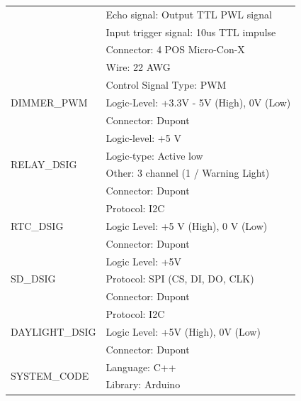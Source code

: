\documentclass{article}
\begin{document}
\begin{longtable}{|l|l|}
                                 & Echo signal: Output TTL PWL signal        \\*
                                 & Input trigger signal: 10us TTL impulse    \\*
                                 & Connector: 4 POS Micro-Con-X              \\*
                                 & Wire: 22 AWG                              \\* 
\hline
\multirow{3}{*}{DIMMER\_PWM}     & Control Signal Type: PWM                  \\*
                                 & Logic-Level: +3.3V - 5V (High), 0V (Low)  \\*
                                 & Connector: Dupont                         \\* 
\hline
\multirow{4}{*}{RELAY\_DSIG}     & Logic-level: +5 V                         \\*
                                 & Logic-type: Active low                    \\*
                                 & Other: 3 channel (1 / Warning Light)      \\*
                                 & Connector: Dupont                         \\* 
\hline
\multirow{3}{*}{RTC\_DSIG}       & Protocol: I2C                             \\*
                                 & Logic Level: +5 V (High), 0 V (Low)       \\*
                                 & Connector: Dupont                         \\* 
\hline
\multirow{3}{*}{SD\_DSIG}        & Logic Level: +5V                          \\*
                                 & Protocol: SPI (CS, DI, DO, CLK)           \\*
                                 & Connector: Dupont                         \\* 
\hline
\multirow{3}{*}{DAYLIGHT\_DSIG}  & Protocol: I2C                             \\*
                                 & Logic Level: +5V (High), 0V (Low)         \\*
                                 & Connector: Dupont                         \\* 
\hline
\multirow{3}{*}{SYSTEM\_CODE}    & Language: C++                             \\*
                                 & Library: Arduino                          \\*

\end{longtable}
\end{document}
